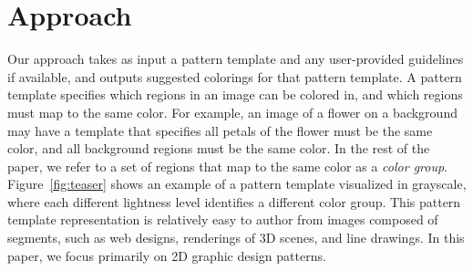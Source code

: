 \section{Approach}
\label{sec:approach}


Our approach takes as input a pattern template and any user-provided guidelines if available, and outputs suggested colorings for that pattern template. A pattern template specifies which regions in an image can be colored in, and which regions must map to the same color. For example, an image of a flower on a background may have a template that specifies all petals of the flower must be the same color, and all background regions must be the same color. In the rest of the paper, we refer to a set of regions that map to the same color as a \emph{color group}. Figure~\ref{fig:teaser} shows an example of a pattern template visualized in grayscale, where each different lightness level identifies a different color group. This pattern template representation is relatively easy to author from images composed of segments, such as web designs, renderings of 3D scenes, and line drawings. In this paper, we focus primarily on 2D graphic design patterns. 





